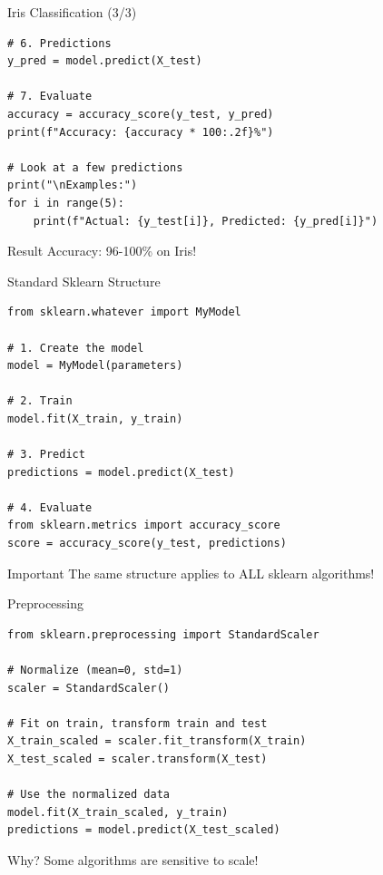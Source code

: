 \documentclass[aspectratio=169]{beamer}
\begin{document}
\begin{frame}[fragile]{Iris Classification (3/3)}
\begin{lstlisting}
# 6. Predictions
y_pred = model.predict(X_test)

# 7. Evaluate
accuracy = accuracy_score(y_test, y_pred)
print(f"Accuracy: {accuracy * 100:.2f}%")

# Look at a few predictions
print("\nExamples:")
for i in range(5):
    print(f"Actual: {y_test[i]}, Predicted: {y_pred[i]}")
\end{lstlisting}

\vspace{0.3cm}
\begin{block}{Result}
Accuracy: 96-100\% on Iris!
\end{block}
\end{frame}

\begin{frame}[fragile]{Standard Sklearn Structure}
\begin{lstlisting}
from sklearn.whatever import MyModel

# 1. Create the model
model = MyModel(parameters)

# 2. Train
model.fit(X_train, y_train)

# 3. Predict
predictions = model.predict(X_test)

# 4. Evaluate
from sklearn.metrics import accuracy_score
score = accuracy_score(y_test, predictions)
\end{lstlisting}

\begin{alertblock}{Important}
The same structure applies to ALL sklearn algorithms!
\end{alertblock}
\end{frame}

\begin{frame}[fragile]{Preprocessing}
\begin{lstlisting}
from sklearn.preprocessing import StandardScaler

# Normalize (mean=0, std=1)
scaler = StandardScaler()

# Fit on train, transform train and test
X_train_scaled = scaler.fit_transform(X_train)
X_test_scaled = scaler.transform(X_test)

# Use the normalized data
model.fit(X_train_scaled, y_train)
predictions = model.predict(X_test_scaled)
\end{lstlisting}

\vspace{0.3cm}
\begin{block}{Why?}
Some algorithms are sensitive to scale!
\end{block}
\end{frame}
\end{document}
